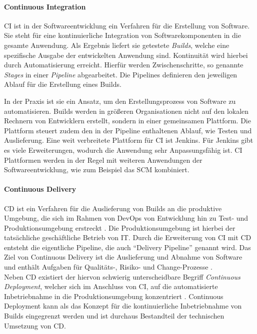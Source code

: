 \paragraph{Continuous Integration}
\ac{CI} ist in der Softwareentwicklung ein Verfahren für die Erstellung von Software. Sie steht für eine kontinuierliche Integration von Softwarekomponenten in die gesamte Anwendung. Als Ergebnis liefert sie getestete \emph{Builds}, welche eine spezifische Ausgabe der entwickelten Anwendung sind. Kontinuität wird hierbei durch Automatisierung erreicht. Hierfür werden Zwischenschritte, so genannte \emph{Stages} in einer \emph{Pipeline} abgearbeitet. Die Pipelines definieren den jeweiligen Ablauf für die Erstellung eines Builds.

In der Praxis ist sie ein Ansatz, um den Erstellungsprozess von Software zu automatisieren. Builds werden in größeren Organisationen nicht auf den lokalen Rechnern von Entwicklern erstellt, sondern in einer gemeinsamen Plattform. Die Plattform steuert zudem den in der Pipeline enthaltenen Ablauf, wie Testen und Auslieferung. Eine weit verbreitete Plattform für \ac{CI} ist Jenkins. Für Jenkins gibt es viele Erweiterungen, wodurch die Anwendung sehr Anpassungsfähig ist. 
\ac{CI} Plattformen werden in der Regel mit weiteren Anwendungen der Softwareentwicklung, wie zum Beispiel das \ac{SCM} kombiniert. 

\paragraph{Continuous Delivery}
\ac{CD} ist ein Verfahren für die Auslieferung von Builds an die produktive Umgebung, die sich im Rahmen von DevOps von Entwicklung hin zu Test- und Produktionsumgebung erstreckt \citet{Alt2017}. Die Produktionsumgebung ist hierbei der tatsächliche geschäftliche Betrieb von IT. Durch die Erweiterung von \ac{CI} mit \ac{CD} entsteht die eigentliche Pipeline, die auch \enquote{Delivery Pipeline} genannt wird. Das Ziel von Continuous Delivery ist die Auslieferung und Abnahme von Software und enthält Aufgaben für Qualitäts-, Risiko- und Change-Prozesse \cite{Alt2017}.
\medskip
\\
Neben \ac{CD} existiert der hiervon schwierig unterscheidbare Begriff \emph{Continuous Deployment}, welcher sich im Anschluss von \ac{CI}, auf die automatisierte Inbetriebnahme in die Produktionsumgebung konzentriert \cite{Alt2017}. Continuous Deployment kann als das Konzept für die kontinuierliche Inbetriebnahme von Builds eingegrenzt werden und ist durchaus Bestandteil der technischen Umsetzung von \ac{CD}.

